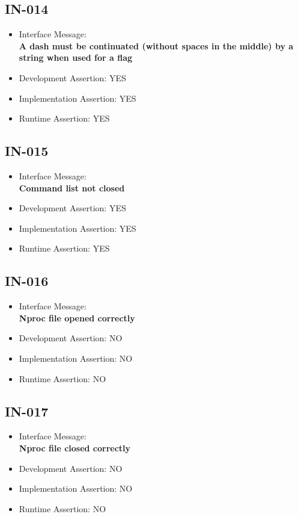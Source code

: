 \subsection{IN-014}
\begin{itemize}
  \item Interface Message:\\[1em]
    \textbf{A dash must be continuated (without spaces in the middle) by a string when used for a flag}
  \item Development Assertion: YES
  \item Implementation Assertion: YES
  \item Runtime Assertion: YES
\end{itemize}

\subsection{IN-015}
\begin{itemize}
  \item Interface Message:\\[1em]
    \textbf{Command list not closed}
  \item Development Assertion: YES
  \item Implementation Assertion: YES
  \item Runtime Assertion: YES
\end{itemize}

\subsection{IN-016}
\begin{itemize}
  \item Interface Message:\\[1em]
    \textbf{Nproc file opened correctly}
  \item Development Assertion: NO
  \item Implementation Assertion: NO
  \item Runtime Assertion: NO
\end{itemize}

\subsection{IN-017}
\begin{itemize}
  \item Interface Message:\\[1em]
    \textbf{Nproc file closed correctly}
  \item Development Assertion: NO
  \item Implementation Assertion: NO
  \item Runtime Assertion: NO
\end{itemize}

